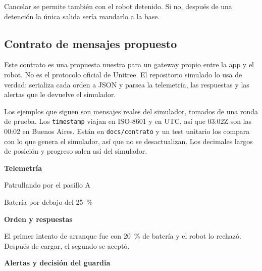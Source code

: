 Cancelar se permite también con el robot detenido. Si no, después de una detención la única salida sería mandarlo a la base.

\subsection{Contrato de mensajes propuesto}
\label{sec:contrato}

Este contrato es una propuesta nuestra para un gateway propio entre la app y el robot. No es el protocolo oficial de Unitree. El repositorio simulado lo usa de verdad: serializa cada orden a JSON y parsea la telemetría, las respuestas y las alertas que le devuelve el simulador.

Los ejemplos que siguen son mensajes reales del simulador, tomados de una ronda de prueba. Los \texttt{timestamp} viajan en ISO-8601 y en UTC, así que 03:02Z son las 00:02 en Buenos Aires. Están en \texttt{docs/contrato} y un test unitario los compara con lo que genera el simulador, así que no se desactualizan. Los decimales largos de posición y progreso salen así del simulador.

\textbf{Telemetría}

\noindent
\begin{minipage}[t]{0.49\textwidth}
\small Patrullando por el pasillo A

\end{minipage}\hfill
\begin{minipage}[t]{0.49\textwidth}
\small Batería por debajo del 25~\%

\end{minipage}

\textbf{Orden y respuestas}

El primer intento de arranque fue con 20~\% de batería y el robot lo rechazó. Después de cargar, el segundo se aceptó.

\noindent
\begin{minipage}[t]{0.49\textwidth}

\end{minipage}\hfill
\begin{minipage}[t]{0.49\textwidth}


\end{minipage}

\textbf{Alertas y decisión del guardia}

